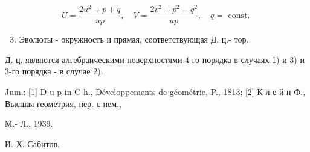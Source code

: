 \documentclass[10pt]{article}
\begin{document}
\[

U=\frac{2 u^{2}+p+q}{u p}, \quad V=\frac{2 v^{2}+p^{2}-q^{2}}{u p}, \quad q=\text { const. }

\]



\begin{enumerate}

  \setcounter{enumi}{2}

  \item Эволюты - окружность и прямая, соответствующая Д. ц.- тор.

\end{enumerate}



Д. ц. являются алгебраическими поверхностями 4-го порядка в случаях 1) и 3) и 3-го порядка - в случае 2).



Jum.: [1] D u p in C h., Développements de géométrie, P., 1813; [2] К л е й н Ф., Высшая геометрия, пер. с нем.,

М.- Л., 1939.

И. Х. Сабитов.
\end{document}
